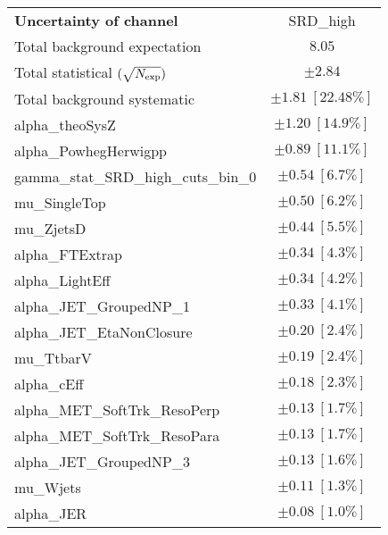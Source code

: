 
\begin{table}
\begin{center}
\setlength{\tabcolsep}{0.0pc}
\begin{tabular*}{\textwidth}{@{\extracolsep{\fill}}lc}
\noalign{\smallskip}\hline\noalign{\smallskip}
{\bf Uncertainty of channel}                                    & SRD\_high            \\
\noalign{\smallskip}\hline\noalign{\smallskip}
Total background expectation             &  $8.05$       \\
\noalign{\smallskip}\hline\noalign{\smallskip}
Total statistical $(\sqrt{N_{\rm exp}})$              & $\pm 2.84$       \\
Total background systematic               & $\pm 1.81\ [22.48\%] $             \\
\noalign{\smallskip}\hline\noalign{\smallskip}
\noalign{\smallskip}\hline\noalign{\smallskip}
alpha\_theoSysZ         & $\pm 1.20\ [14.9\%] $       \\
alpha\_PowhegHerwigpp         & $\pm 0.89\ [11.1\%] $       \\
gamma\_stat\_SRD\_high\_cuts\_bin\_0         & $\pm 0.54\ [6.7\%] $       \\
mu\_SingleTop         & $\pm 0.50\ [6.2\%] $       \\
mu\_ZjetsD         & $\pm 0.44\ [5.5\%] $       \\
alpha\_FTExtrap         & $\pm 0.34\ [4.3\%] $       \\
alpha\_LightEff         & $\pm 0.34\ [4.2\%] $       \\
alpha\_JET\_GroupedNP\_1         & $\pm 0.33\ [4.1\%] $       \\
alpha\_JET\_EtaNonClosure         & $\pm 0.20\ [2.4\%] $       \\
mu\_TtbarV         & $\pm 0.19\ [2.4\%] $       \\
alpha\_cEff         & $\pm 0.18\ [2.3\%] $       \\
alpha\_MET\_SoftTrk\_ResoPerp         & $\pm 0.13\ [1.7\%] $       \\
alpha\_MET\_SoftTrk\_ResoPara         & $\pm 0.13\ [1.7\%] $       \\
alpha\_JET\_GroupedNP\_3         & $\pm 0.13\ [1.6\%] $       \\
mu\_Wjets         & $\pm 0.11\ [1.3\%] $       \\
alpha\_JER         & $\pm 0.08\ [1.0\%] $       \\

\end{tabular*}
\end{center}
\end{table}

